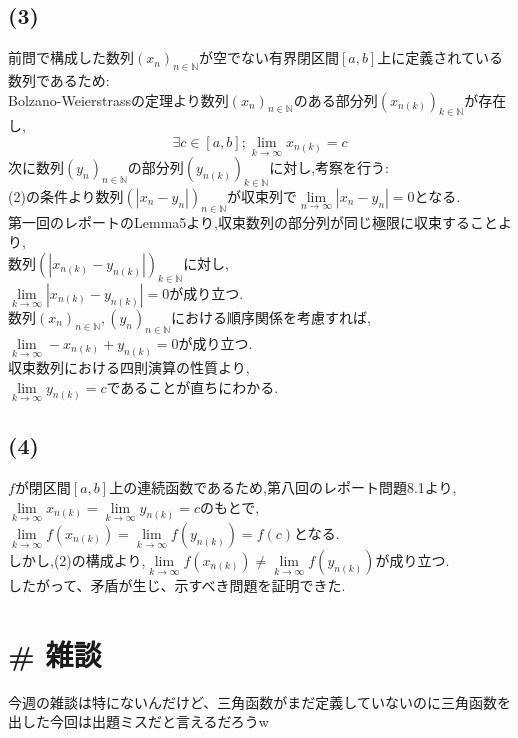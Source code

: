 \documentclass{jreport}
\begin{document}
\subsection{(3)}
前問で構成した数列$(x_n)_{n \in \mathbb{N}}$が空でない有界閉区間$[a,b]$上に定義されている数列であるため:\\
Bolzano-Weierstrassの定理より数列$(x_n)_{n \in \mathbb{N}}$のある部分列$(x_{n(k)})_{k\in \mathbb{N}}$が存在し,\\
$$
\exists c \in [a,b]; \lim\limits_{k \to \infty} x_{n(k)} =c
$$
次に数列$(y_n)_{n \in \mathbb{N}}$の部分列$(y_{n(k)})_{k\in \mathbb{N}}$に対し,考察を行う:\\
(2)の条件より数列$(|x_n -y_n|)_{n \in \mathbb{N}}$が収束列で$\lim\limits_{n \to \infty}|x_n -y_n| =0$となる.\\
第一回のレポートのLemma5より,収束数列の部分列が同じ極限に収束することより,\\
数列$(|x_{n(k)} - y_{n(k)}|)_{k \in \mathbb{N}}$に対し,\\
$\lim\limits_{k \to \infty}|x_{n(k)} - y_{n(k)}|=0$が成り立つ.\\
数列$(x_n)_{n\in \mathbb{N}},(y_n)_{n \in \mathbb{N}}$における順序関係を考慮すれば,\\
$\lim\limits_{k \to \infty} -x_{n(k)} +y_{n(k)} =0$が成り立つ.\\
収束数列における四則演算の性質より,\\
$\lim\limits_{k \to \infty} y_{n(k)} =c$であることが直ちにわかる.\\
\subsection{(4)}
$f$が閉区間$[a,b]$上の連続函数であるため,第八回のレポート問題8.1より,\\
$\lim\limits_{k \to \infty} x_{n(k)} =\lim\limits_{k \to \infty} y_{n(k)} =c$のもとで,\\
$\lim\limits_{k \to \infty} f(x_{n(k)}) =\lim\limits_{k \to \infty} f(y_{n(k)}) =f(c)$となる.\\
しかし,(2)の構成より,$\lim\limits_{k \to \infty} f(x_{n(k)}) \ne \lim\limits_{k \to \infty} f(y_{n(k)})$が成り立つ.\\
したがって、矛盾が生じ、示すべき問題を証明できた.
\newpage
\section{\# 雑談}
今週の雑談は特にないんだけど、三角函数がまだ定義していないのに三角函数を出した今回は出題ミスだと言えるだろうw
\end{document}
